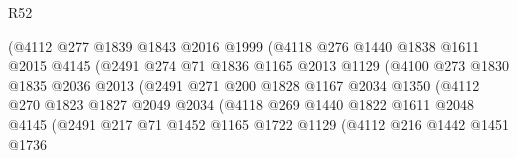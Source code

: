 \begin{lexlean}{R52}
\begin{coremodule}
                              (@4112
                                @277
                                @1839
                                @1843
                                @2016
                                @1999
                                (@4118
                                  @276
                                  @1440
                                  @1838
                                  @1611
                                  @2015
                                  @4145
                                  (@2491
                                    @274
                                    @71
                                    @1836
                                    @1165
                                    @2013
                                    @1129
                                    (@4100
                                      @273
                                      @1830
                                      @1835
                                      @2036
                                      @2013
                                      (@2491
                                        @271
                                        @200
                                        @1828
                                        @1167
                                        @2034
                                        @1350
                                        (@4112
                                          @270
                                          @1823
                                          @1827
                                          @2049
                                          @2034
                                          (@4118
                                            @269
                                            @1440
                                            @1822
                                            @1611
                                            @2048
                                            @4145
                                            (@2491
                                              @217
                                              @71
                                              @1452
                                              @1165
                                              @1722
                                              @1129
                                              (@4112
                                                @216
                                                @1442
                                                @1451
                                                @1736

\end{coremodule}
\end{lexlean}
